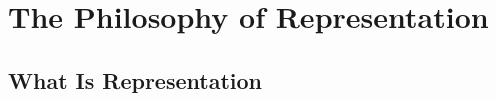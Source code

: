 \chapter{The Philosophy of Representation}
\label{ch:philosophy-of-representation}
\section{What Is Representation}
\label{sec:what-is-representation}